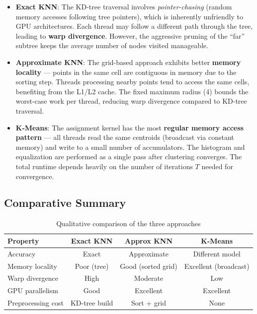 \documentclass[11pt,a4paper]{article}
\begin{document}
\begin{itemize}
    \item \textbf{Exact KNN}: The KD-tree traversal involves \textit{pointer-chasing} (random memory accesses following tree pointers), which is inherently unfriendly to GPU architectures. Each thread may follow a different path through the tree, leading to \textbf{warp divergence}. However, the aggressive pruning of the ``far'' subtree keeps the average number of nodes visited manageable.

    \item \textbf{Approximate KNN}: The grid-based approach exhibits better \textbf{memory locality} --- points in the same cell are contiguous in memory due to the sorting step. Threads processing nearby points tend to access the same cells, benefiting from the L1/L2 cache. The fixed maximum radius (4) bounds the worst-case work per thread, reducing warp divergence compared to KD-tree traversal.

    \item \textbf{K-Means}: The assignment kernel has the most \textbf{regular memory access pattern} --- all threads read the same centroids (broadcast via constant memory) and write to a small number of accumulators. The histogram and equalization are performed as a single pass after clustering converges. The total runtime depends heavily on the number of iterations $T$ needed for convergence.
\end{itemize}

\subsection{Comparative Summary}

\begin{table}[H]
    \centering
    \caption{Qualitative comparison of the three approaches}
    \label{tab:comparison}
    \begin{tabular}{@{}lccc@{}}
        \toprule
        \textbf{Property} & \textbf{Exact KNN} & \textbf{Approx KNN} & \textbf{K-Means} \\
        \midrule
        Accuracy           & Exact  & Approximate & Different model \\
        Memory locality    & Poor (tree)  & Good (sorted grid) & Excellent (broadcast) \\
        Warp divergence    & High   & Moderate & Low \\
        GPU parallelism    & Good   & Excellent & Excellent \\
        Preprocessing cost & KD-tree build & Sort + grid & None \\
        \bottomrule
    \end{tabular}
\end{table}
\end{document}
